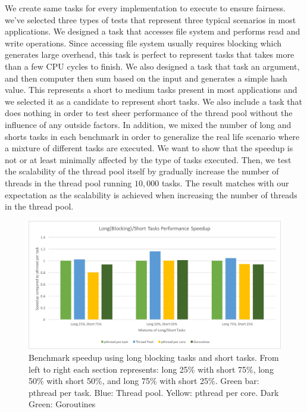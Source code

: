 \documentclass[journal, a4paper]{IEEEtran}
\begin{document}
We create same tasks for every implementation to execute to ensure fairness. we've selected three types of tests that represent three typical scenarios in most applications. We designed a task that accesses file system and performs read and write operations. Since accessing file system usually requires blocking which generates large overhead, this task is perfect to represent tasks that takes more than a few CPU cycles to finish. We also designed a task that task an argument, and then computer then sum based on the input and generates a simple hash value. This represents a short to medium tasks present in most applications and we selected it as a candidate to represent short tasks. We also include a task that does nothing in order to test sheer performance of the thread pool without the influence of any outside factors. In addition, we mixed the number of long and shorts tasks in each benchmark in order to generalize the real life scenario where a mixture of different tasks are executed. We want to show that the speedup is not or at least minimally affected by the type of tasks executed. Then, we test the scalability of the thread pool itself by gradually increase the number of threads in the thread pool running $10,000$ tasks. The result matches with our expectation as the scalability is achieved when increasing the number of threads in the thread pool.\\

\newpage

\begin{figure}[!hbt]
		\begin{center}
		\includegraphics[width=\columnwidth]{test_1.png}
		\caption{Benchmark speedup using long blocking tasks and short tasks. From left to right each section represents: long 25\% with short 75\%, long 50\% with short 50\%, and long 75\% with short 25\%. Green bar: pthread per task. Blue: Thread pool. Yellow: pthread per core. Dark Green: Goroutines}
		\label{fig:tf_plot}
		\end{center}
	\end{figure}
	
\end{document}
